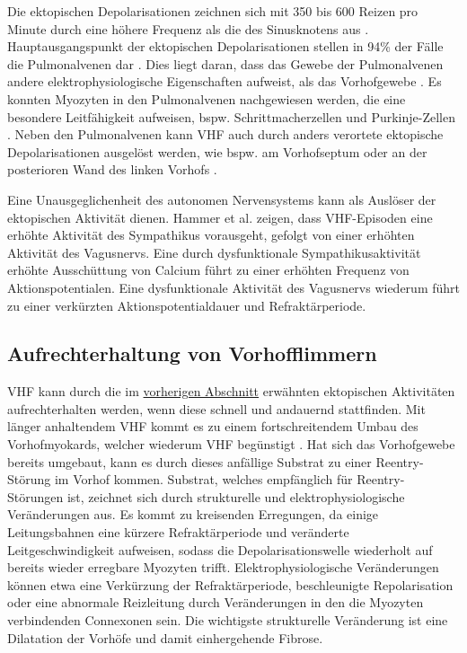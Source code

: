 Die ektopischen Depolarisationen zeichnen sich mit 350 bis 600 Reizen pro Minute durch eine höhere Frequenz als die des Sinusknotens aus \cite{sigg_cardiac_2010}. Hauptausgangspunkt der ektopischen Depolarisationen stellen in 94\% der Fälle die Pulmonalvenen dar \cite{haissaguerre_spontaneous_1998}. Dies liegt daran, dass das Gewebe der Pulmonalvenen andere elektrophysiologische Eigenschaften aufweist, als das Vorhofgewebe \cite{chen_initiation_1999}. Es konnten Myozyten in den Pulmonalvenen nachgewiesen werden, die eine besondere Leitfähigkeit aufweisen, bspw. Schrittmacherzellen und Purkinje-Zellen \cite{perez-lugones_evidence_2003}.
Neben den Pulmonalvenen kann \gls{VHF} auch durch anders verortete ektopische Depolarisationen ausgelöst werden, wie bspw. am Vorhofseptum oder an der posterioren Wand des linken Vorhofs  \cite{santangeli_techniques_2017}. 

Eine Unausgeglichenheit des autonomen Nervensystems kann als Auslöser der ektopischen Aktivität dienen. Hammer et al. \cite{hammer_cardiovascular_2023} zeigen, dass \gls{VHF}-Episoden eine erhöhte Aktivität des Sympathikus vorausgeht, gefolgt von einer erhöhten Aktivität des Vagusnervs.  Eine durch dysfunktionale Sympathikusaktivität erhöhte Ausschüttung von Calcium führt zu einer erhöhten Frequenz von Aktionspotentialen. Eine dysfunktionale Aktivität des Vagusnervs wiederum führt zu einer verkürzten Aktionspotentialdauer und Refraktärperiode. \cite{khan_heart_2019}

\subsection{Aufrechterhaltung von Vorhofflimmern}

\gls{VHF} kann durch die im \hyperref[sec:auslöser]{vorherigen Abschnitt} erwähnten ektopischen Aktivitäten aufrechterhalten werden, wenn diese schnell und andauernd stattfinden. Mit länger anhaltendem \gls{VHF} kommt es zu einem fortschreitendem Umbau des Vorhofmyokards, welcher wiederum \gls{VHF} begünstigt \cite{wijffels_atrial_1995}. Hat sich das Vorhofgewebe bereits umgebaut, kann es durch dieses anfällige Substrat zu einer Reentry-Störung im Vorhof kommen. Substrat, welches empfänglich für Reentry-Störungen ist, zeichnet sich durch strukturelle und elektrophysiologische Veränderungen aus. Es kommt zu kreisenden Erregungen, da einige Leitungsbahnen eine kürzere Refraktärperiode und veränderte Leitgeschwindigkeit aufweisen, sodass die Depolarisationswelle wiederholt auf bereits wieder erregbare Myozyten trifft. Elektrophysiologische Veränderungen können etwa eine Verkürzung der Refraktärperiode, beschleunigte Repolarisation oder eine abnormale Reizleitung durch Veränderungen in den die Myozyten verbindenden Connexonen sein. Die wichtigste strukturelle Veränderung ist eine Dilatation der Vorhöfe und damit einhergehende Fibrose. \cite{wijesurendra_mechanisms_2019}

